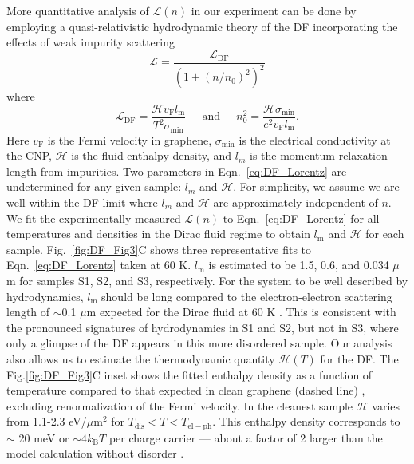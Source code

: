More quantitative analysis of $\mathcal{L}(n)$ in our experiment can be done by employing a quasi-relativistic hydrodynamic theory of the DF incorporating the effects of weak impurity scattering \cite{hartnoll_theory_2007, muller_quantum-critical_2008, foster_slow_2009}
\begin{equation}
\label{eq:DF_Lorentz}
 \mathcal{L} =  \frac{\mathcal{L}_{\mathrm{DF}}}{\left(1+(n/n_0)^2\right)^2}
 \end{equation}
 where 
\begin{equation}
\mathcal{L}_{\mathrm{DF}} = \frac{\mathcal{H}v_{\mathrm{F}}l_{\mathrm{m}}}{T^2 \sigma_{\mathrm{min}}} \;\;\;\; \textrm{~and~} \;\;\;\; n_0^2 = \frac{\mathcal{H}\sigma_{\mathrm{min}}}{e^2v_{\mathrm{F}}l_{\mathrm{m}}}.
\end{equation}
Here $v_{\mathrm{F}}$ is the Fermi velocity in graphene, $\sigma_{\mathrm{min}}$ is the electrical conductivity at the CNP, $\mathcal{H}$ is the fluid enthalpy density, and $l_m$ is the momentum relaxation length from impurities. Two parameters in Eqn.~\ref{eq:DF_Lorentz} are undetermined for any given sample: $l_m$ and  $\mathcal{H}$.  For simplicity, we assume we are well within the DF limit where $l_m$ and $\mathcal{H}$ are approximately independent of $n$. We fit the experimentally measured $\mathcal{L}(n)$ to Eqn.~\ref{eq:DF_Lorentz} for all temperatures and densities in the Dirac fluid regime to obtain $l_{\mathrm{m}}$ and $\mathcal{H}$  for each sample.  Fig.~\ref{fig:DF_Fig3}C shows three representative fits to Eqn.~\ref{eq:DF_Lorentz} taken at 60 K. $l_{\mathrm{m}}$ is estimated to be 1.5, 0.6, and 0.034 $\mu$m for samples S1, S2, and S3, respectively.  For the system to be well described by hydrodynamics, $l_{\mathrm{m}}$ should be long compared to the electron-electron scattering length of $\sim$0.1 $\mu$m expected for the Dirac fluid at 60 K \cite{muller_graphene:_2009}.  This is consistent with the pronounced signatures of hydrodynamics in S1 and S2, but not in S3, where only a glimpse of the DF appears in this more disordered sample. Our analysis also allows us to estimate the thermodynamic quantity $\mathcal{H}(T)$ for the DF. The Fig.\ref{fig:DF_Fig3}C inset shows the fitted enthalpy density as a function of temperature compared to that expected in clean graphene (dashed line) \cite{muller_graphene:_2009}, excluding renormalization of the Fermi velocity. In the cleanest sample $\mathcal{H}$ varies from 1.1-2.3 eV/$\mu$m$^2$ for $T_{\mathrm{dis}}<T<T_{\mathrm{el-ph}}$.   This enthalpy density corresponds to  $\sim$ 20 meV or $\sim4k_{\mathrm{B}}T$ per charge carrier --- about a factor of 2 larger than the model calculation without disorder \cite{muller_graphene:_2009}.  

